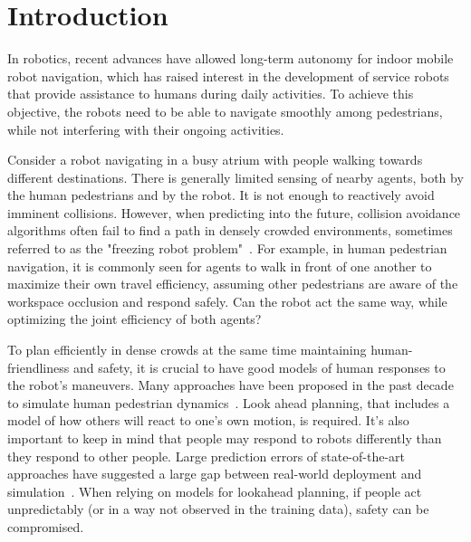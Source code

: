 \documentclass[conference]{IEEEtran}
\begin{document}
\section{Introduction}
\vspace{-0.3em}
\label{sec:intro}
\noindent
In robotics, recent advances have allowed long-term autonomy for indoor mobile 
robot navigation, which has raised interest in the development of service 
robots that provide assistance to humans during daily activities. To achieve 
this objective, the robots need to be able to navigate smoothly among pedestrians, while 
not interfering with their ongoing activities. 

Consider a robot navigating in a busy atrium with people walking towards 
different destinations. There is generally limited sensing of nearby agents, 
both by the human pedestrians and by the robot. It is not enough to reactively 
avoid imminent collisions. However, when predicting into the future, 
collision avoidance algorithms often fail to find a path in 
densely crowded environments, sometimes referred to as the "freezing robot 
problem"~\cite{trautman2010unfreezing}. For example, in human pedestrian 
navigation, it is commonly seen for agents to walk in front of one 
another to maximize their own travel efficiency, assuming other pedestrians 
are aware of the workspace occlusion and respond safely. Can the robot act 
the same way, while optimizing the joint efficiency of both agents?  

To plan efficiently in dense crowds at the same time maintaining 
human-friendliness and safety, it is crucial to have good models of human 
responses to the robot's maneuvers. Many approaches have been proposed in the 
past decade to simulate human pedestrian dynamics~\cite{lamarche2004crowd, 
  treuille2006continuum, %
karamouzas2009predictive}.
Look ahead planning, that includes a model of how others will react to one's 
own motion, is required. It's also important to keep in mind that people may 
respond to robots differently than they respond to other people. Large 
prediction errors of state-of-the-art approaches have suggested a large gap 
between real-world deployment and 
simulation~\cite{trautman2015robot,pfeiffer2016predicting}. When 
relying on models for lookahead planning, if people act unpredictably (or in a 
way not observed in the training data), safety can be compromised. 
\end{document}
